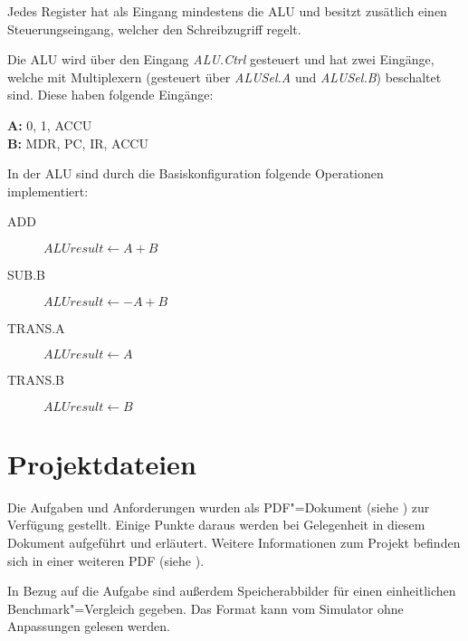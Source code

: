 Jedes Register hat als Eingang mindestens die ALU und besitzt zusätlich einen Steuerungseingang, welcher den Schreibzugriff regelt.

Die ALU wird über den Eingang \emph{ALU.Ctrl} gesteuert und  hat zwei Eingänge, welche mit Multiplexern (gesteuert über \emph{ALUSel.A} und \emph{ALUSel.B}) beschaltet sind. Diese haben folgende Eingänge:

\textbf{A:} 0, 1, ACCU\\
\textbf{B:} MDR, PC, IR, ACCU 

In der ALU sind durch die Basiskonfiguration folgende Operationen implementiert:

\begin{description}
    \item[ADD] $ALUresult \gets A + B$
    \item[SUB.B] $ALUresult \gets -A + B$
    \item[TRANS.A] $ALUresult \gets A$
    \item[TRANS.B] $ALUresult \gets B$
\end{description}



\section{Projektdateien}
\label{section:Pflichtenheft-Istzustand-Projektdateien}

Die Aufgaben und Anforderungen wurden als PDF"=Dokument (siehe \cite{aufgabenblatt}) zur Verfügung gestellt. Einige Punkte daraus werden bei Gelegenheit in diesem Dokument aufgeführt und erläutert. Weitere Informationen zum Projekt befinden sich in einer weiteren PDF (siehe \cite{projektinfo}).

In Bezug auf die Aufgabe sind außerdem Speicherabbilder für einen einheitlichen Benchmark"=Vergleich gegeben. Das Format kann vom Simulator ohne Anpassungen gelesen werden.


